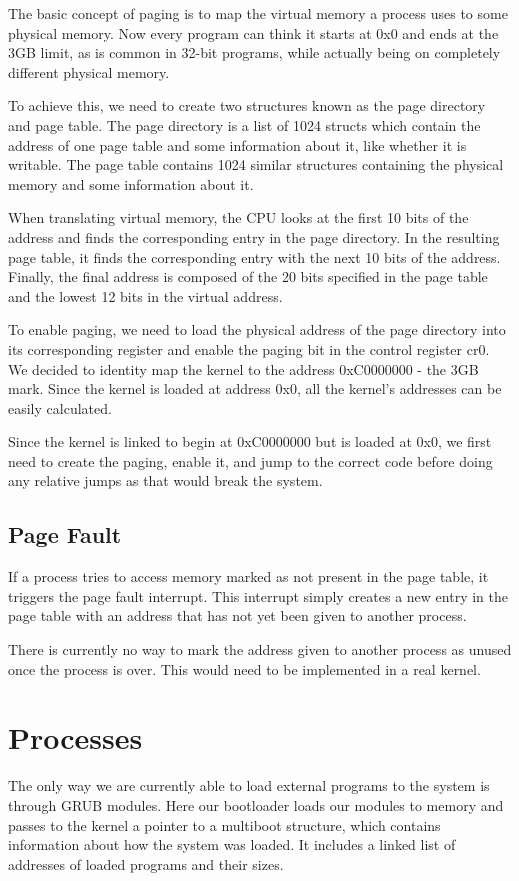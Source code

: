 \documentclass{article}
\begin{document}
The basic concept of paging is to map the virtual memory a process uses to some physical memory. Now every program can think it starts at 0x0 and ends at the 3GB limit, as is common in 32-bit programs, while actually being on completely different physical memory.

To achieve this, we need to create two structures known as the page directory and page table. The page directory is a list of 1024 structs which contain the address of one page table and some information about it, like whether it is writable. The page table contains 1024 similar structures containing the physical memory and some information about it.

When translating virtual memory, the CPU looks at the first 10 bits of the address and finds the corresponding entry in the page directory. In the resulting page table, it finds the corresponding entry with the next 10 bits of the address. Finally, the final address is composed of the 20 bits specified in the page table and the lowest 12 bits in the virtual address.

To enable paging, we need to load the physical address of the page directory into its corresponding register and enable the paging bit in the control register cr0. We decided to identity map the kernel to the address 0xC0000000 - the 3GB mark. Since the kernel is loaded at address 0x0, all the kernel's addresses can be easily calculated.

Since the kernel is linked to begin at 0xC0000000 but is loaded at 0x0, we first need to create the paging, enable it, and jump to the correct code before doing any relative jumps as that would break the system.

\subsection{Page Fault}
If a process tries to access memory marked as not present in the page table, it triggers the page fault interrupt. This interrupt simply creates a new entry in the page table with an address that has not yet been given to another process. 

There is currently no way to mark the address given to another process as unused once the process is over. This would need to be implemented in a real kernel. 

\section{Processes}
The only way we are currently able to load external programs to the system is through GRUB modules. Here our bootloader loads our modules to memory and passes to the kernel a pointer to a multiboot structure, which contains information about how the system was loaded. It includes a linked list of addresses of loaded programs and their sizes. 
\end{document}
